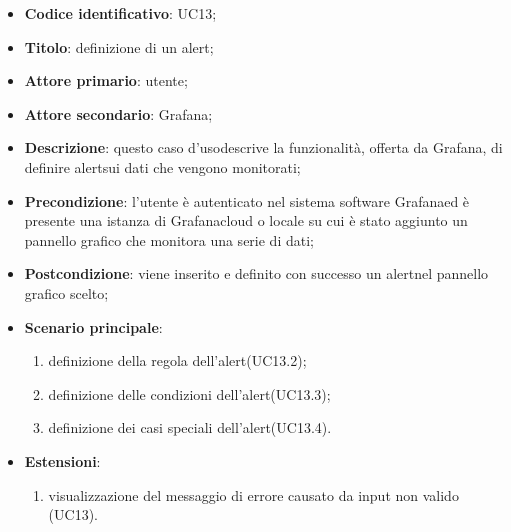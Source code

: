 \begin{itemize}
	\item \textbf{Codice identificativo}: UC13;
	\item \textbf{Titolo}: definizione di un alert\glo;
	\item \textbf{Attore primario}: utente;
	\item \textbf{Attore secondario}: Grafana\glo;
	\item \textbf{Descrizione}: questo caso d'uso\glosp descrive la funzionalità, offerta da Grafana\glo, di definire alert\glosp sui dati che vengono monitorati;
	\item \textbf{Precondizione}: l'utente è autenticato nel sistema software Grafana\glosp ed è presente una istanza di Grafana\glosp cloud o locale su cui è stato aggiunto un pannello grafico che monitora una serie di dati;
	\item \textbf{Postcondizione}: viene inserito e definito con successo un alert\glosp nel pannello grafico scelto;
	\item \textbf{Scenario principale}: 
	\begin{enumerate}
		\item definizione della regola dell'alert\glosp (UC13.2);
		\item definizione delle condizioni dell'alert\glosp (UC13.3);
		\item definizione dei casi speciali dell'alert\glosp (UC13.4).
	\end{enumerate}

	\item \textbf{Estensioni}:	
	\begin{enumerate}
		\item visualizzazione del messaggio di errore causato da input non valido (UC13).
	\end{enumerate}
\end{itemize}

